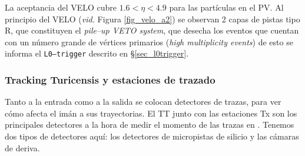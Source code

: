 La aceptancia del VELO cubre $1.6<\eta<4.9$ para las partículas en el PV. Al principio del VELO (\emph{vid.} Figura \ref{fig_velo_a2}) se observan 2 capas de pistas tipo R, que constituyen el \emph{pile--up VETO system}, que desecha los eventos que cuentan con un número grande de vértices primarios (\emph{high multiplicity events}) de esto se informa el \texttt{L0--trigger} descrito en \S \ref{sec_l0trigger}. 





\subsubsection{Tracking Turicensis y estaciones de trazado} %

Tanto a la entrada como a la salida se colocan detectores de trazas, para ver cómo afecta el imán a sus trayectorias. El TT junto con las estaciones Tx son los principales detectores a la hora de medir el momento de las trazas en \lhcb \cite{Alves:1129809}. Tenemos dos tipos de detectores aquí: los detectores de micropistas de silicio y las cámaras de deriva.

